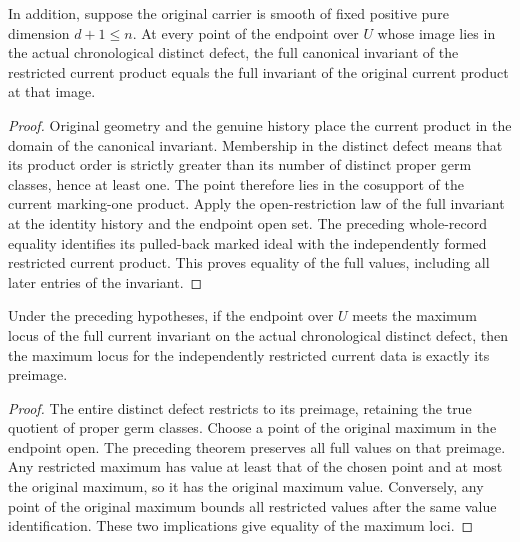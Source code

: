 \begin{theorem}
\label{hir:sharp-original-current-full-value-open}
\leanok
In addition, suppose the original carrier is smooth of fixed
positive pure dimension $d+1\leq n$. At every point of the endpoint over $U$ whose image
lies in the actual chronological distinct defect, the full canonical
invariant of the restricted current product equals the full invariant of the
original current product at that image.
\end{theorem}
\begin{proof}
Original geometry and the genuine history place the current product in the
domain of the canonical invariant. Membership in the distinct defect means
that its product order is strictly greater than its number of distinct proper
germ classes, hence at least one. The point therefore lies in the cosupport
of the current marking-one product. Apply the open-restriction law of the full
invariant at the identity history and the endpoint open set. The preceding
whole-record equality identifies its pulled-back marked ideal with the
independently formed restricted current product. This proves equality of the
full values, including all later entries of the invariant.
\end{proof}

\begin{theorem}
\label{hir:sharp-original-current-dynamic-maximum-open}
\leanok
Under the preceding hypotheses, if the endpoint over $U$ meets the maximum
locus of the full current invariant on the actual chronological distinct
defect, then the maximum locus for the independently restricted current data
is exactly its preimage.
\end{theorem}
\begin{proof}
The entire distinct defect restricts to its preimage, retaining the true
quotient of proper germ classes. Choose a point of the original maximum in
the endpoint open. The preceding theorem preserves all full values on that
preimage. Any restricted maximum has value at least that of the chosen point
and at most the original maximum, so it has the original maximum value.
Conversely, any point of the original maximum bounds all restricted values
after the same value identification. These two implications give equality
of the maximum loci.
\end{proof}

